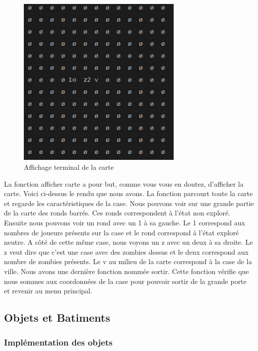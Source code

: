\documentclass[a4paper,11pt]{article}
\begin{document}
\begin{figure}[h]
    \begin{center}
    \includegraphics[width=8cm] {carte.png}
    \caption{Affichage terminal de la carte}
    \label{carte}
    \end{center}
\end{figure}

La fonction afficher carte a pour but, comme vous vous en doutez, d’afficher la carte. Voici ci-dessus le rendu que nous avons. La fonction parcourt toute la carte et regarde les caractéristiques de la case. Nous pouvons voir sur une grande partie de la carte des ronds barrés. Ces ronds correspondent à l’état non exploré. Ensuite nous pouvons voir un rond avec un 1 à sa gauche. Le 1 correspond aux nombres de joueurs présents sur la case et le rond correspond à l’état exploré neutre. A côté de cette même case, nous voyons un z avec un deux à sa droite. Le z veut dire que c’est une case avec des zombies dessus et le deux correspond aux nombre de zombies présents. Le v au milieu de la carte correspond à la case de la ville.
Nous avons une dernière fonction nommée sortir. Cette fonction vérifie que nous sommes aux coordonnées de la case pour pouvoir sortir de la grande porte et revenir au menu principal.

\newpage

\subsection{Objets et Batiments}

\subsubsection{Implémentation des objets}
\end{document}
